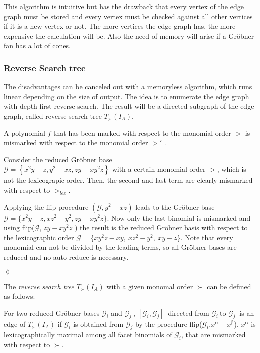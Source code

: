 This algorithm is intuitive but has the drawback that every vertex of the edge graph must be stored and every vertex must be checked against all other vertices if it is a new vertex or not. 
The more vertices the edge graph has, the more expensive the calculation will be. Also the need of memory will arise if a Gröbner fan has a lot of cones.
 
 \newpage

\subsubsection{Reverse Search tree}
The disadvantages can be canceled out with a memoryless algorithm, which runs linear depending on the size of output. The idea is to enumerate the edge graph with depth-first reverse search. The result will be a directed subgraph of the edge graph, called reverse search tree $T_{\succ}(I_{A}) $.\\
\begin{env_definition}
\cite{tigers}
A polynomial $f$ that has been marked with respect to the monomial order $>$  is mismarked with respect to the monomial order $>'$  .
\end{env_definition}

\begin{env_example}\normalfont
Consider the reduced Gröbner base \\ $\mathcal{G} = \left\lbrace x^{2}y-z,y^{2}-xz, zy-xy^{2}z \right\rbrace $ 
with a certain monomial order $>$, which is not the lexicograpic order.
Then, the second and last term are clearly mismarked with respect to $>_{lex}$.

Applying the flip-procedure $(\mathcal{G},y^{2}-xz)$ leads to the Gröbner base $\mathcal{G} = \{x^{2}y-z,xz^{2}-y^{2}, zy-xy^{2}z \} $. Now only the last binomial is mismarked and using flip($\mathcal{G}$, $zy-xy^{2}z$ ) the result is the reduced Gröbner basis with respect to the lexicographic order $\mathcal{G} = \{xy^{2}z -xy,~xz^{2}-y^{2},~xy-z \} $. Note that every monomial can not be divided by the leading terms, so all Gröbner bases are reduced and no auto-reduce is necessary.
 
\begin{flushright}
$\lozenge$
\end{flushright} 
\end{env_example}


The \textit{reverse search tree} $T_{\succ}(I_{A}) $ with a given monomal order $ \succ $ can be defined as follows:
\begin{env_definition}
\label{def:reverse}
\cite{tigers} For two reduced Gröbner bases $\mathcal{G}_{i}$ and $\mathcal{G}_{j}~$, $[\mathcal{G}_{i},\mathcal{G}_{j} ]~$ directed from $\mathcal{G}_{i}~$to $\mathcal{G}_{j}~$ is an edge of $T_{\succ}(I_{A}) $ if $\mathcal{G}_{i}$ is obtained from $\mathcal{G}_{j}$ by the procedure flip($\mathcal{G}_{i}$,$x^{\upalpha} - x^{\upbeta}$).
$x^{\upalpha}$ is lexicographically maximal among all facet binomials of $\mathcal{G}_{i}$, that are mismarked with respect to $\succ$.
\end{env_definition}


